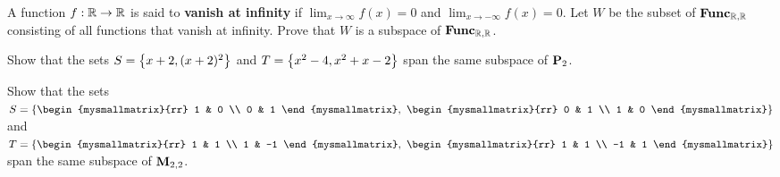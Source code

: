 \begin{ex}
  A function $f:\mathbb{R}\to\mathbb{R}$ is said to \textbf{vanish at infinity}%
   if $\lim_{x\to\infty}f(x)=0$ and
  $\lim_{x\to-\infty}f(x)=0$. Let $W$ be the subset of $\mathbf{Func}_{\mathbb{R},\mathbb{R}}$
  consisting of all functions that vanish at infinity. Prove that $W$
  is a subspace of $\mathbf{Func}_{\mathbb{R},\mathbb{R}}$.
\end{ex}

\begin{ex}
  Show that the sets $S=\left\{x+2,(x+2)^2\right\}$ and
  $T=\left\{x^2-4, x^2+x-2\right\}$ span the same subspace of $\mathbf{P}_2$.
\end{ex}

\begin{ex}
  Show that the sets $S=\set{
    \begin{mysmallmatrix}{rr} 1 & 0 \\ 0 & 1 \end{mysmallmatrix},~
    \begin{mysmallmatrix}{rr} 0 & 1 \\ 1 & 0 \end{mysmallmatrix}
  }$ and $T=\set{
    \begin{mysmallmatrix}{rr} 1 & 1 \\ 1 & -1 \end{mysmallmatrix},~
    \begin{mysmallmatrix}{rr} 1 & 1 \\ -1 & 1 \end{mysmallmatrix}
  }$
  span the same subspace of $\mathbf{M}_{2,2}$.
\end{ex}
